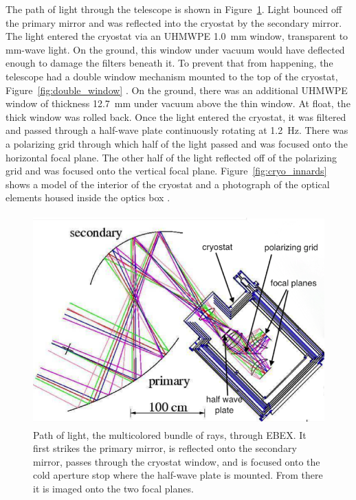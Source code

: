 The path of light through the telescope is shown in Figure~\ref{fig:optical_path}. 
Light bounced off the primary mirror and was reflected into the cryostat by the secondary mirror. 
The light entered the cryostat via an \ac{UHMWPE} 1.0~mm window, transparent to mm-wave light. 
On the ground, this window under vacuum would have deflected enough to damage the filters beneath it. 
To prevent that from happening, the telescope had a double window mechanism mounted to the top of the cryostat, Figure~\ref{fig:double_window} \cite{Zilic2017}. 
On the ground, there was an additional \ac{UHMWPE} window of thickness 12.7~mm under vacuum above the thin window. 
At float, the thick window was rolled back. 
Once the light entered the cryostat, it was filtered and passed through a half-wave plate continuously rotating at 1.2~Hz. %
There was a polarizing grid through which half of the light passed and was focused onto the horizontal focal plane.
The other half of the light reflected off of the polarizing grid and was focused onto the vertical focal plane. 
Figure~\ref{fig:cryo_innards} shows a model of the interior of the cryostat and a photograph of the optical elements housed inside the optics box \cite{EBEXPaper1}. 

\begin{figure}[htbp]
\begin{center}
\includegraphics[height=3.2in]{figures/ebex_optical_path.png}
\caption[EBEX optical path]{Path of light, the multicolored bundle of rays, through \ac{EBEX}. It first strikes the primary mirror, is reflected onto the secondary mirror, passes through the cryostat window, and is focused onto the cold aperture stop where the half-wave plate is mounted. From there it is imaged onto the two focal planes. 
\label{fig:optical_path} }
\end{center}
\end{figure}

